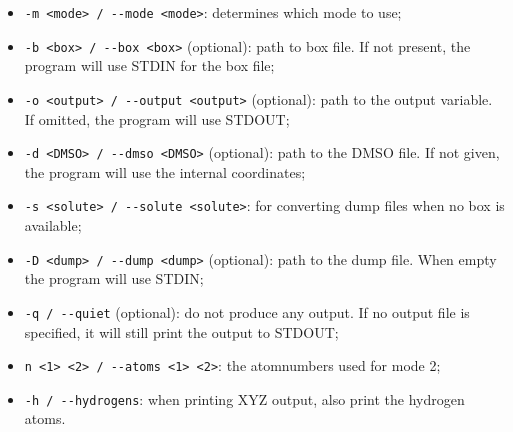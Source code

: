 \begin{itemize}
	\item \verb|-m <mode> / --mode <mode>|: determines which mode to use;
	\item \verb|-b <box> / --box <box>| (optional): path to box file. If not 
	present, the 
	program will use STDIN for the box file;
	\item \verb|-o <output> / --output <output>| (optional): path to the output 
	variable. If 
	omitted, the program will use STDOUT;
	\item \verb|-d <DMSO> / --dmso <DMSO>| (optional): path to the DMSO file. 
	If not given, the 
	program will use the internal coordinates;
	\item \verb|-s <solute> / --solute <solute>|: for converting dump files 
	when no box is 
	available;
	\item \verb|-D <dump> / --dump <dump>| (optional): path to the dump file. 
	When empty the 
	program will use STDIN;
	\item \verb|-q / --quiet| (optional): do not produce any output. If no 
	output file is 
	specified, it will still print the output to STDOUT;
	\item \verb|n <1> <2> / --atoms <1> <2>|: the atomnumbers used for mode 2;
	\item \verb|-h / --hydrogens|: when printing XYZ output, also print the 
	hydrogen atoms.
\end{itemize}